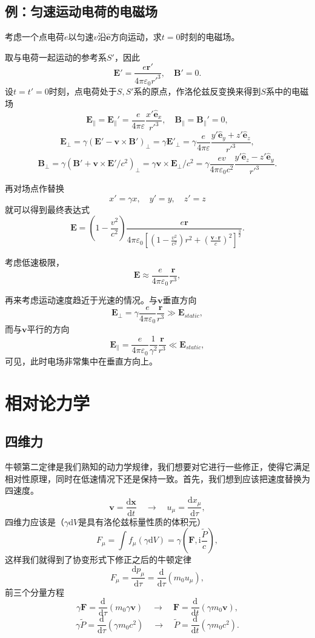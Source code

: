 \documentclass[UTF8]{ctexbook}
\renewcommand{\d}{\mathrm{d}}
\renewcommand{\b}{\boldsymbol}
\renewcommand{\i}{\mathrm{i}}
\numberwithin{equation}{chapter}
\begin{document}
	
	\subsection{例：匀速运动电荷的电磁场}
	考虑一个点电荷$e$以匀速$v$沿$\hat{\b{e}}$方向运动，求$t=0$时刻的电磁场。
	
	取与电荷一起运动的参考系$S'$，因此
	\[\b{E}'=\frac{e\b{r}'}{4\pi\varepsilon_0 r'^3},\quad \b{B}'=0.\]
	设$t=t'=0$时刻，点电荷处于$S,S'$系的原点，作洛伦兹反变换来得到$S$系中的电磁场
	\[\b{E}_\parallel=\b{E}_\parallel'=\frac{e}{4\pi\varepsilon}\frac{x'\hat{\b{e}}_x}{r'^3},\quad \b{B}_\parallel=\b{B}_\parallel'=0,\]
	\[\b{E}_\perp=\gamma(\b{E}'-\b{v}\times\b{B}')_\perp=\gamma \b{E}'_\perp=\gamma\frac{e}{4\pi\varepsilon}\frac{y'\hat{\b{e}}_y+z'\hat{\b{e}}_z}{r'^3},\]
	\[\b{B}_\perp=\gamma(\b{B}'+\b{v}\times\b{E}'/c^2)_\perp=\gamma\b{v}\times\b{E}_\perp/c^2=\gamma\frac{ev}{4\pi\varepsilon_0 c^2}\frac{y'\hat{\b{e}}_z-z'\hat{\b{e}}_y}{r'^3}.\]
	
	再对场点作替换
	\[x'=\gamma x,\quad y'=y,\quad z'=z\]
	就可以得到最终表达式
	\[\b{E}=\left(1-\frac{v^2}{c^2}\right)\frac{e\b{r}}{4\pi\varepsilon_0\left[\left(1-\frac{v^2}{c^2}\right)r^2+\left(\frac{\b{v}\cdot\b{r}}{c}\right)^2\right]^{\frac{3}{2}}}.\]
	
	考虑低速极限，
	\[\b{E}\approx \frac{e}{4\pi\varepsilon_0}\frac{\b{r}}{r^3},\]
	
	再来考虑运动速度趋近于光速的情况。与$\b{v}$垂直方向
	\[\b{E}_\perp=\gamma\frac{e}{4\pi\varepsilon_0}\frac{\b{r}}{r^3} \gg \b{E}_{static},\]
	而与$\b{v}$平行的方向
	\[\b{E}_\parallel=\frac{e}{4\pi\varepsilon_0}\frac{1}{\gamma^2}\frac{\b{r}}{r^3} \ll \b{E}_{static},\]
	可见，此时电场非常集中在垂直方向上。
	
	\section{相对论力学}
	
	\subsection{四维力}
	牛顿第二定律是我们熟知的动力学规律，我们想要对它进行一些修正，使得它满足相对性原理，同时在低速情况下还是保持一致。首先，我们想到应该把速度替换为四速度。
	\[\b{v}=\frac{\d \b{x}}{\d t}\quad \rightarrow \quad u_\mu=\frac{\d x_\mu}{\d \tau},\]
	四维力应该是（$\gamma \d V$是具有洛伦兹标量性质的体积元）
	\[F_\mu=\int f_\mu (\gamma\d V) =\gamma(\b{F},\i\frac{\tilde{P}}{c}),\]
	这样我们就得到了协变形式下修正之后的牛顿定律
	\[F_\mu=\frac{\d p_\mu}{\d \tau}=\frac{\d }{\d \tau}(m_0 u_\mu),\]
	前三个分量方程
	\[\gamma\b{F}=\frac{\d }{\d \tau}(m_0\gamma\b{v})\quad \rightarrow \quad \b{F}=\frac{\d}{\d t}(\gamma m_0\b{v}),\]
	\[\gamma\tilde{P}=\frac{\d }{\d \tau}(\gamma m_0 c^2)\quad \rightarrow \quad  \tilde{P}=\frac{\d }{\d t}(\gamma m_0 c^2).\]
	
\end{document}
